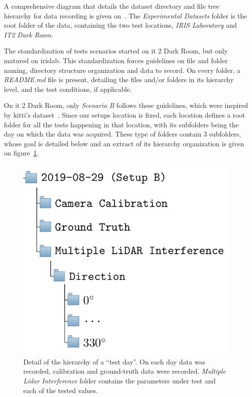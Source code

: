 A comprehensive diagram that details the dataset directory and file tree hierarchy for data recording is given on~. The \textit{Experimental Datasets} folder is the root folder of the data, containing the two test locations, \textit{IRIS Laboratory} and \textit{IT2 Dark Room}. 

The standardization of tests scenarios started on \ac{it} 2 Dark Room, but only matured on \ac{irislab}. This standardization forces guidelines on file and folder naming, directory structure organization and data to record. On every folder, a \textit{README.md} file is present, detailing the files and/or folders in its hierarchy level, and the test conditions, if applicable. 

On \ac{it} 2 Dark Room, only \textit{Scenario B} follows these guidelines, which were inspired by \ac{kitti}'s dataset~\cite{Geiger2013a}. Since our setups location is fixed, each location defines a root folder for all the tests happening in that location, with its subfolders being the day on which the data was acquired. These type of folders contain  3 subfolders, whose goal is detailed below and an extract of its  hierarchy organization is given on figure~\ref{fig:test-subfolders}.

\begin{figure}[H]
\centering
\includegraphics[scale=0.3]{img/datasets/test-subfolders.png}
\caption{Detail of the hierarchy of a ``test day''. On each day data was recorded, calibration and ground-truth data were recorded. \textit{Multiple Lidar Interference} folder contains the parameters under test and each of the tested values.}
\label{fig:test-subfolders}
\end{figure}


